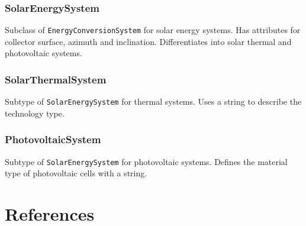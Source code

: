 \documentclass[a4paper,12pt]{article}
\let\stdsection\section%
\renewcommand\section{\newpage\stdsection}
\begin{document}
\subsubsection{SolarEnergySystem}\label{solarenergysystem}

Subclass of \lstinline!EnergyConversionSystem! for solar energy systems.
Has attributes for collector surface, azimuth and inclination.
Differentiates into solar thermal and photovoltaic systems.

\subsubsection{SolarThermalSystem}\label{solarthermalsystem}

Subtype of \lstinline!SolarEnergySystem! for thermal systems. Uses a
string to describe the technology type.

\subsubsection{PhotovoltaicSystem}\label{photovoltaicsystem}

Subtype of \lstinline!SolarEnergySystem! for photovoltaic systems.
Defines the material type of photovoltaic cells with a string.

\section*{References}\label{references}

\hypertarget{refs}{}
\end{document}
